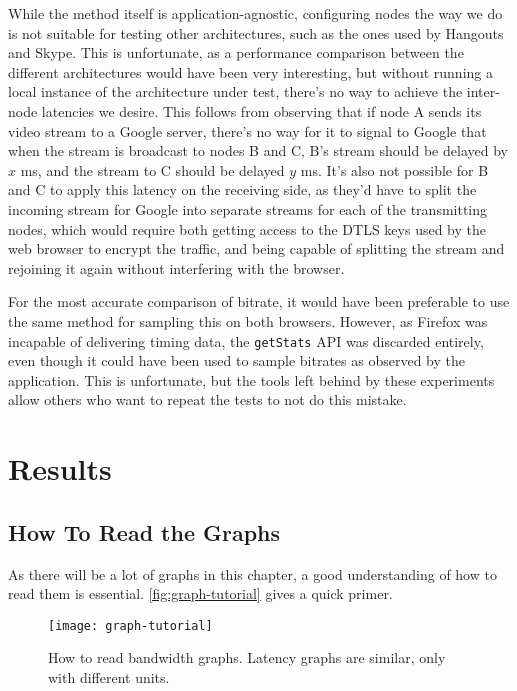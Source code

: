 While the method itself is application-agnostic, configuring nodes the way we do is not suitable for testing other architectures, such as the ones used by Hangouts and Skype. This is unfortunate, as a performance comparison between the different architectures would have been very interesting, but without running a local instance of the architecture under test, there's no way to achieve the inter-node latencies we desire. This follows from observing that if node A sends its video stream to a Google server, there's no way for it to signal to Google that when the stream is broadcast to nodes B and C, B's stream should be delayed by $x$ ms, and the stream to C should be delayed $y$ ms. It's also not possible for B and C to apply this latency on the receiving side, as they'd have to split the incoming stream for Google into separate streams for each of the transmitting nodes, which would require both getting access to the DTLS keys used by the web browser to encrypt the traffic, and being capable of splitting the stream and rejoining it again without interfering with the browser.

For the most accurate comparison of bitrate, it would have been preferable to use the same method for sampling this on both browsers. However, as Firefox was incapable of delivering timing data, the \texttt{getStats} API was discarded entirely, even though it could have been used to sample bitrates as observed by the application. This is unfortunate, but the tools left behind by these experiments allow others who want to repeat the tests to not do this mistake.


\section{Results}

\subsection{How To Read the Graphs}

As there will be a lot of graphs in this chapter, a good understanding of how to read them is essential. \autoref{fig:graph-tutorial} gives a quick primer.

\begin{figure}
    \centering
    \texttt{[image: graph-tutorial]}
    \caption{How to read bandwidth graphs. Latency graphs are similar, only with different units.}
    \label{fig:graph-tutorial}
\end{figure}

